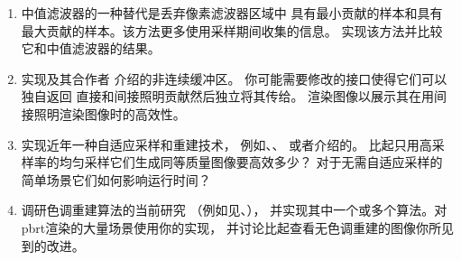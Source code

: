 \begin{enumerate}
      \item \circletwo 中值滤波器的一种替代是丢弃像素滤波器区域中
            具有最小贡献的样本和具有最大贡献的样本。该方法更多使用采样期间收集的信息。
            实现该方法并比较它和中值滤波器的结果。
      \item \circlethree 实现\citeauthor{keller1998quasi}及其合作者
            介绍的非连续缓冲区\citep{keller1998quasi,10.2312:EGWR:EGWR02:015-024}。
            你可能需要修改的接口使得它们可以独自返回
            直接和间接照明贡献然后独立将其传给。
            渲染图像以展示其在用间接照明渲染图像时的高效性。
      \item \circlethree 实现近年一种自适应采样和重建技术，
            例如\citet{10.1145/1360612.1360632}、\citet{10.1145/1531326.1531399}、
            \citet{10.1145/1618452.1618486}或者\citet{10.1145/2641762}介绍的。
            比起只用高采样率的均匀采样它们生成同等质量图像要高效多少？
            对于无需自适应采样的简单场景它们如何影响运行时间？
      \item \circlethree 调研色调重建算法的当前研究
            （例如见\citet{reinhard2010high}、\citet{10.1145/2366145.2366220}），
            并实现其中一个或多个算法。对pbrt渲染的大量场景使用你的实现，
            并讨论比起查看无色调重建的图像你所见到的改进。
\end{enumerate}